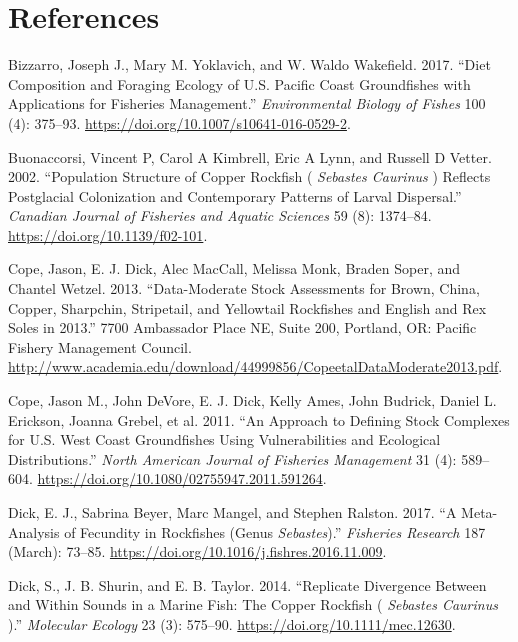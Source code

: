 \documentclass[11pt,
  english,
  a4paper,
]{article}
\begin{document}
\hypertarget{references}{%
\section{References}\label{references}}

\leavevmode\tagmcend\tagstructend

\hypertarget{refs}{}
\begin{cslreferences}
\leavevmode\hypertarget{ref-bizzarro_diet_2017-1}{}%
Bizzarro, Joseph J., Mary M. Yoklavich, and W. Waldo Wakefield. 2017. ``Diet Composition and Foraging Ecology of U.S. Pacific Coast Groundfishes with Applications for Fisheries Management.'' \emph{Environmental Biology of Fishes} 100 (4): 375--93. \url{https://doi.org/10.1007/s10641-016-0529-2}.

\leavevmode\hypertarget{ref-buonaccorsi_population_2002}{}%
Buonaccorsi, Vincent P, Carol A Kimbrell, Eric A Lynn, and Russell D Vetter. 2002. ``Population Structure of Copper Rockfish ( \emph{Sebastes Caurinus} ) Reflects Postglacial Colonization and Contemporary Patterns of Larval Dispersal.'' \emph{Canadian Journal of Fisheries and Aquatic Sciences} 59 (8): 1374--84. \url{https://doi.org/10.1139/f02-101}.

\leavevmode\hypertarget{ref-cope_data-moderate_2013}{}%
Cope, Jason, E. J. Dick, Alec MacCall, Melissa Monk, Braden Soper, and Chantel Wetzel. 2013. ``Data-Moderate Stock Assessments for Brown, China, Copper, Sharpchin, Stripetail, and Yellowtail Rockfishes and English and Rex Soles in 2013.'' 7700 Ambassador Place NE, Suite 200, Portland, OR: Pacific Fishery Management Council. \url{http://www.academia.edu/download/44999856/CopeetalDataModerate2013.pdf}.

\leavevmode\hypertarget{ref-cope_approach_2011}{}%
Cope, Jason M., John DeVore, E. J. Dick, Kelly Ames, John Budrick, Daniel L. Erickson, Joanna Grebel, et al. 2011. ``An Approach to Defining Stock Complexes for U.S. West Coast Groundfishes Using Vulnerabilities and Ecological Distributions.'' \emph{North American Journal of Fisheries Management} 31 (4): 589--604. \url{https://doi.org/10.1080/02755947.2011.591264}.

\leavevmode\hypertarget{ref-dick_meta-analysis_2017}{}%
Dick, E. J., Sabrina Beyer, Marc Mangel, and Stephen Ralston. 2017. ``A Meta-Analysis of Fecundity in Rockfishes (Genus \emph{Sebastes}).'' \emph{Fisheries Research} 187 (March): 73--85. \url{https://doi.org/10.1016/j.fishres.2016.11.009}.

\leavevmode\hypertarget{ref-dick_replicate_2014}{}%
Dick, S., J. B. Shurin, and E. B. Taylor. 2014. ``Replicate Divergence Between and Within Sounds in a Marine Fish: The Copper Rockfish ( \emph{Sebastes Caurinus} ).'' \emph{Molecular Ecology} 23 (3): 575--90. \url{https://doi.org/10.1111/mec.12630}.


\end{cslreferences}
\end{document}
